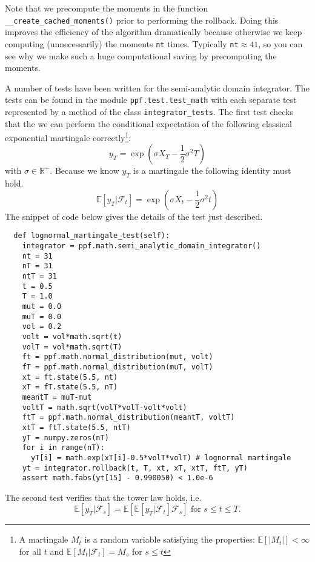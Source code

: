 Note that we precompute the moments in the function
\verb|__create_cached_moments()| prior to performing the
rollback. Doing this improves the efficiency of the algorithm
dramatically because otherwise we keep computing (unnecessarily) the
moments \verb|nt| times. Typically \verb|nt|$\approx 41$, so you can
see why we make such a huge computational saving by precomputing the
moments.

A number of tests have been written for the semi-analytic domain
integrator. The tests can be found in the module
\verb|ppf.test.test_math| with each separate test represented by a
method of the class \verb|integrator_tests|. The first test checks
that the we can perform the conditional expectation of the following
classical exponential martingale correctly\footnote{A martingale $M_t$
is a random variable satisfying the properties: $\mathbb E[\left| M_t
\right| ] < \infty$ for all $t$ and $\mathbb E[M_t | \mathcal F_t] =
M_s$ for $s \le t$}:
\begin{equation}
y_T = \exp\left(\sigma X_T - \frac{1}{2} \sigma^2 T\right)
\end{equation}
with $\sigma \in \mathbb R^{+}$. Because we know $y_T$ is a martingale
the following identity must hold.
\begin{equation}
\mathbb E[y_T | \mathcal F_t] = \exp\left(\sigma X_t -\frac{1}{2} \sigma^2 t\right)
\end{equation}
The snippet of code below gives the details of the test just
described.
\begin{verbatim}
  def lognormal_martingale_test(self):
    integrator = ppf.math.semi_analytic_domain_integrator()
    nt = 31
    nT = 31
    ntT = 31
    t = 0.5
    T = 1.0
    mut = 0.0
    muT = 0.0
    vol = 0.2
    volt = vol*math.sqrt(t)
    volT = vol*math.sqrt(T)
    ft = ppf.math.normal_distribution(mut, volt)
    fT = ppf.math.normal_distribution(muT, volT)
    xt = ft.state(5.5, nt)
    xT = fT.state(5.5, nT)
    meantT = muT-mut
    voltT = math.sqrt(volT*volT-volt*volt)
    ftT = ppf.math.normal_distribution(meantT, voltT)
    xtT = ftT.state(5.5, ntT)
    yT = numpy.zeros(nT)
    for i in range(nT): 
      yT[i] = math.exp(xT[i]-0.5*volT*volT) # lognormal martingale
    yt = integrator.rollback(t, T, xt, xT, xtT, ftT, yT)
    assert math.fabs(yt[15] - 0.990050) < 1.0e-6
\end{verbatim}
The second test verifies that the tower law holds, i.e. 
\begin{equation}
\mathbb E[y_T| \mathcal F_s] = \mathbb E[\mathbb E[y_T | \mathcal F_t]\mathcal F_s] \mbox{ for } s \le t \le T. 
\end{equation}

